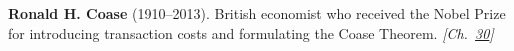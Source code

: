 \nobeleconomics \textbf{Ronald H. Coase} (1910–2013). British economist who received the Nobel Prize for introducing transaction costs and formulating the Coase Theorem. \emph{[Ch.~\hyperref[ch:simpsonsparadox]{30}]}


